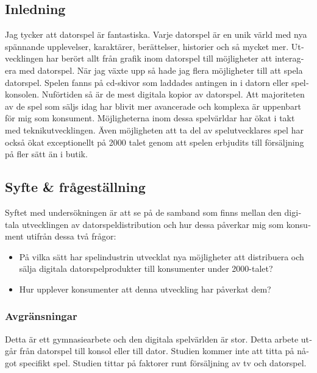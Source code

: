 \documentclass[11p]{article}
\begin{document}
    \begin{otherlanguage}{swedish}
    \tableofcontents

    \newpage

        \section{Inledning}
        Jag tycker att datorspel är fantastiska.
        Varje datorspel är en unik värld med nya spännande upplevelser, karaktärer, berättelser, historier och så mycket mer.
        Utvecklingen har berört allt från grafik inom datorspel till möjligheter att interagera med datorspel.
        När jag växte upp så hade jag flera möjligheter till att spela datorspel.
        Spelen fanns på cd-skivor som laddades antingen in i datorn eller spelkonsolen.
        Nuförtiden så är de mest digitala kopior av datorspel.
        Att majoriteten av de spel som säljs idag har blivit mer avancerade och komplexa är uppenbart för mig som konsument.
        Möjligheterna inom dessa spelvärldar har ökat i takt med teknikutvecklingen.
        Även möjligheten att ta del av spelutvecklares spel har också ökat exceptionellt på 2000 talet genom att spelen erbjudits till försäljning på fler sätt än i butik.
        \subsection{Syfte \& frågeställning}

    Syftet med undersökningen är att se på de samband som finns mellan den digitala utvecklingen av datorspeldistribution och hur dessa påverkar mig som konsument utifrån dessa två frågor:


    \begin{itemize}

            \item På vilka sätt har spelindustrin utvecklat nya möjligheter att distribuera och sälja digitala datorspelprodukter till konsumenter under 2000-talet?

            \item Hur upplever konsumenter att denna utveckling har påverkat dem?

        \end{itemize}

        \subsubsection{Avgränsningar}
    Detta är ett gymnasiearbete och den digitala spelvärlden är stor.
    Detta arbete utgår från datorspel till konsol eller till dator.
    Studien kommer inte att titta på något specifikt spel.
    Studien tittar på faktorer runt försäljning av tv och datorspel.


\end{otherlanguage}
\end{document}

